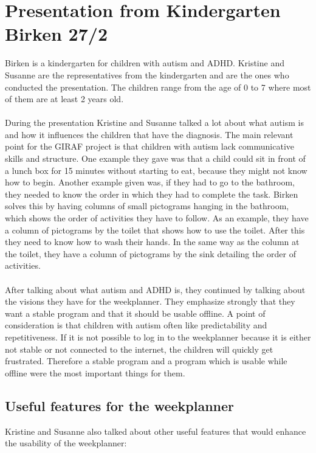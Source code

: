 \section{Presentation from Kindergarten Birken 27/2}\label{presentation-from-birken}
Birken is a kindergarten for children with autism and ADHD.
Kristine and Susanne are the representatives from the kindergarten and are the ones who conducted the presentation.
The children range from the age of 0 to 7 where most of them are at least 2 years old.
\\\\
During the presentation Kristine and Susanne talked a lot about what autism is and how it influences the children that have the diagnosis.
The main relevant point for the GIRAF project is that children with autism lack communicative skills and structure. 
One example they gave was that a child could sit in front of a lunch box for 15 minutes without starting to eat, because they might not know how to begin.
Another example given was, if they had to go to the bathroom, they needed to know the order in which they had to complete the task.
Birken solves this by having columns of small pictograms hanging in the bathroom, which shows the order of activities they have to follow. 
As an example, they have a column of pictograms by the toilet that shows how to use the toilet.
After this they need to know how to wash their hands.
In the same way as the column at the toilet, they have a column of pictograms by the sink detailing the order of activities.
\\\\
After talking about what autism and ADHD is, they continued by talking about the visions they have for the weekplanner.
They emphasize strongly that they want a stable program and that it should be usable offline.
A point of consideration is that children with autism often like predictability and repetitiveness. 
If it is not possible to log in to the weekplanner because it is either not stable or not connected to the internet, the children will quickly get frustrated.
Therefore a stable program and a program which is usable while offline were the most important things for them.

\subsection{Useful features for the weekplanner}
Kristine and Susanne also talked about other useful features that would enhance the usability of the weekplanner:

